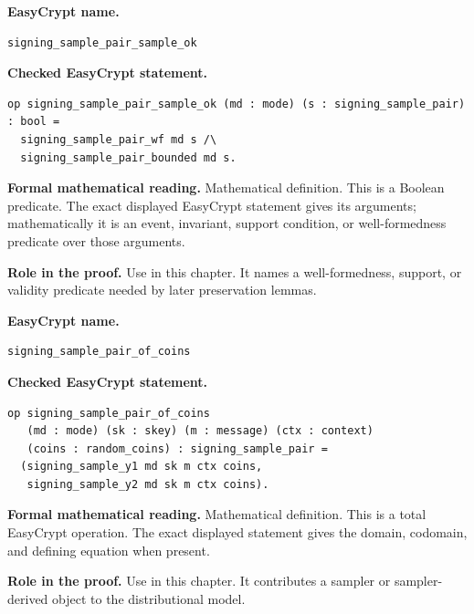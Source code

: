 \begin{formaldefinition}
\noindent\textbf{EasyCrypt name.}
\begin{lstlisting}[language=EasyCrypt,basicstyle=\ttfamily\scriptsize]
signing_sample_pair_sample_ok
\end{lstlisting}
\noindent\textbf{Checked EasyCrypt statement.}
\begin{lstlisting}[language=EasyCrypt,basicstyle=\ttfamily\scriptsize]
op signing_sample_pair_sample_ok (md : mode) (s : signing_sample_pair) : bool =
  signing_sample_pair_wf md s /\
  signing_sample_pair_bounded md s.
\end{lstlisting}
\noindent\textbf{Formal mathematical reading.}
Mathematical definition. This is a Boolean predicate.  The exact displayed EasyCrypt statement gives its arguments; mathematically it is an event, invariant, support condition, or well-formedness predicate over those arguments.

\noindent\textbf{Role in the proof.}
Use in this chapter. It names a well-formedness, support, or validity predicate needed by later preservation lemmas.

\end{formaldefinition}

\begin{formaldefinition}
\noindent\textbf{EasyCrypt name.}
\begin{lstlisting}[language=EasyCrypt,basicstyle=\ttfamily\scriptsize]
signing_sample_pair_of_coins
\end{lstlisting}
\noindent\textbf{Checked EasyCrypt statement.}
\begin{lstlisting}[language=EasyCrypt,basicstyle=\ttfamily\scriptsize]
op signing_sample_pair_of_coins
   (md : mode) (sk : skey) (m : message) (ctx : context)
   (coins : random_coins) : signing_sample_pair =
  (signing_sample_y1 md sk m ctx coins,
   signing_sample_y2 md sk m ctx coins).
\end{lstlisting}
\noindent\textbf{Formal mathematical reading.}
Mathematical definition. This is a total EasyCrypt operation.  The exact displayed statement gives the domain, codomain, and defining equation when present.

\noindent\textbf{Role in the proof.}
Use in this chapter. It contributes a sampler or sampler-derived object to the distributional model.

\end{formaldefinition}

